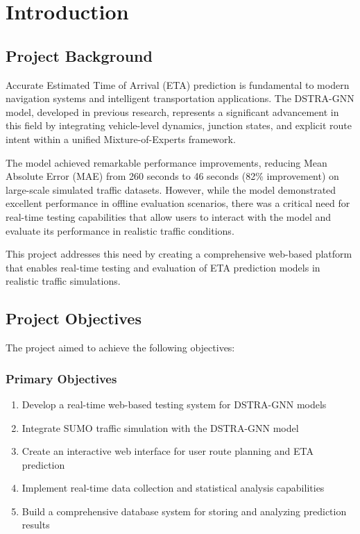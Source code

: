 \section{Introduction}

\subsection{Project Background}

Accurate Estimated Time of Arrival (ETA) prediction is fundamental to modern navigation systems and intelligent transportation applications. The DSTRA-GNN model, developed in previous research, represents a significant advancement in this field by integrating vehicle-level dynamics, junction states, and explicit route intent within a unified Mixture-of-Experts framework.

The model achieved remarkable performance improvements, reducing Mean Absolute Error (MAE) from 260 seconds to 46 seconds (82\% improvement) on large-scale simulated traffic datasets. However, while the model demonstrated excellent performance in offline evaluation scenarios, there was a critical need for real-time testing capabilities that allow users to interact with the model and evaluate its performance in realistic traffic conditions.

This project addresses this need by creating a comprehensive web-based platform that enables real-time testing and evaluation of ETA prediction models in realistic traffic simulations.

\subsection{Project Objectives}

The project aimed to achieve the following objectives:

\subsubsection{Primary Objectives}
\begin{enumerate}
    \item Develop a real-time web-based testing system for DSTRA-GNN models
    \item Integrate SUMO traffic simulation with the DSTRA-GNN model
    \item Create an interactive web interface for user route planning and ETA prediction
    \item Implement real-time data collection and statistical analysis capabilities
    \item Build a comprehensive database system for storing and analyzing prediction results
\end{enumerate}

